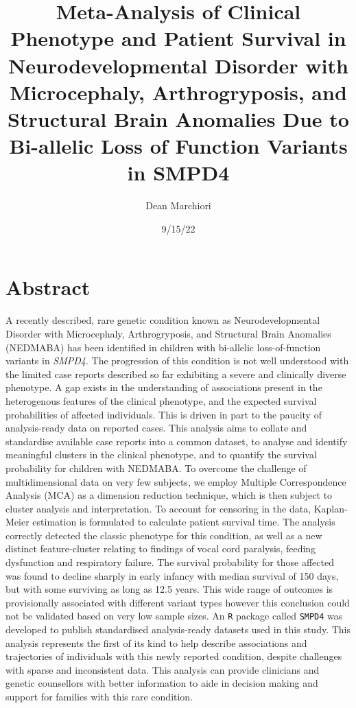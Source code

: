 \documentclass[
  letterpaper,
  DIV=11,
  numbers=noendperiod]{scrartcl}
\title{Meta-Analysis of Clinical Phenotype and Patient Survival in
Neurodevelopmental Disorder with Microcephaly, Arthrogryposis, and
Structural Brain Anomalies Due to Bi-allelic Loss of Function Variants
in SMPD4}
\author{Dean Marchiori}
\date{9/15/22}
\begin{document}
\maketitle
\ifdefined\Shaded\renewenvironment{Shaded}{\begin{tcolorbox}[boxrule=0pt, borderline west={3pt}{0pt}{shadecolor}, interior hidden, breakable, frame hidden, enhanced, sharp corners]}{\end{tcolorbox}}\fi

\hypertarget{abstract}{%
\section{Abstract}\label{abstract}}

A recently described, rare genetic condition known as Neurodevelopmental
Disorder with Microcephaly, Arthrogryposis, and Structural Brain
Anomalies (NEDMABA) has been identified in children with bi-allelic
loss-of-function variants in \emph{SMPD4}. The progression of this
condition is not well understood with the limited case reports described
so far exhibiting a severe and clinically diverse phenotype. A gap
exists in the understanding of associations present in the heterogenous
features of the clinical phenotype, and the expected survival
probabilities of affected individuals. This is driven in part to the
paucity of analysis-ready data on reported cases. This analysis aims to
collate and standardise available case reports into a common dataset, to
analyse and identify meaningful clusters in the clinical phenotype, and
to quantify the survival probability for children with NEDMABA. To
overcome the challenge of multidimensional data on very few subjects, we
employ Multiple Correspondence Analysis (MCA) as a dimension reduction
technique, which is then subject to cluster analysis and interpretation.
To account for censoring in the data, Kaplan-Meier estimation is
formulated to calculate patient survival time. The analysis correctly
detected the classic phenotype for this condition, as well as a new
distinct feature-cluster relating to findings of vocal cord paralysis,
feeding dysfunction and respiratory failure. The survival probability
for those affected was found to decline sharply in early infancy with
median survival of 150 days, but with some surviving as long as 12.5
years. This wide range of outcomes is provisionally associated with
different variant types however this conclusion could not be validated
based on very low sample sizes. An \texttt{R} package called
\texttt{SMPD4} was developed to publish standardised analysis-ready
datasets used in this study. This analysis represents the first of its
kind to help describe associations and trajectories of individuals with
this newly reported condition, despite challenges with sparse and
inconsistent data. This analysis can provide clinicians and genetic
counsellors with better information to aide in decision making and
support for families with this rare condition.
\end{document}
